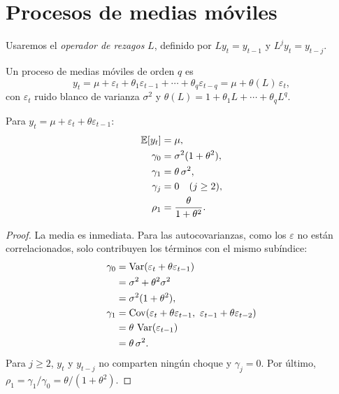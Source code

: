 \section{Procesos de medias móviles}

Usaremos el \emph{operador de rezagos} $L$, definido por $Ly_t=y_{t-1}$ y $L^jy_t=y_{t-j}$.

\begin{definicion}[MA($q$)]
Un proceso de medias móviles de orden $q$ es
\[
  y_t=\mu+\varepsilon_t+\theta_1\varepsilon_{t-1}+\cdots+\theta_q\varepsilon_{t-q}=\mu+\theta(L)\,\varepsilon_t,
\]
con $\varepsilon_t$ ruido blanco de varianza $\sigma^2$ y $\theta(L)=1+\theta_1L+\cdots+\theta_qL^q$.
\end{definicion}

\begin{proposicion}\label{prop:ma1}
Para $y_t=\mu+\varepsilon_t+\theta\varepsilon_{t-1}$:
\begin{align*}
  \mathbb{E}[y_t]  &= \mu,\\
  \gamma_0 &= \sigma^2(1+\theta^2),\\
  \gamma_1 &= \theta\,\sigma^2,\\
  \gamma_j &= 0 \quad (j\ge2),\\
  \rho_1   &= \frac{\theta}{1+\theta^2}.
\end{align*}
\end{proposicion}

\begin{proof}
La media es inmediata. Para las autocovarianzas, como los $\varepsilon$ no están correlacionados, solo
contribuyen los términos con el mismo subíndice:
\begin{align*}
  \gamma_0 &= \Var(\varepsilon_t+\theta\varepsilon_{t-1})\\
           &= \sigma^2+\theta^2\sigma^2\\
           &= \sigma^2(1+\theta^2),\\
  \gamma_1 &= \Cov(\varepsilon_t+\theta\varepsilon_{t-1},\ \varepsilon_{t-1}+\theta\varepsilon_{t-2})\\
           &= \theta\,\Var(\varepsilon_{t-1})\\
           &= \theta\,\sigma^2 .
\end{align*}
Para $j\ge2$, $y_t$ y $y_{t-j}$ no comparten ningún choque y $\gamma_j=0$. Por último,
$\rho_1=\gamma_1/\gamma_0=\theta/(1+\theta^2)$.
\end{proof}

